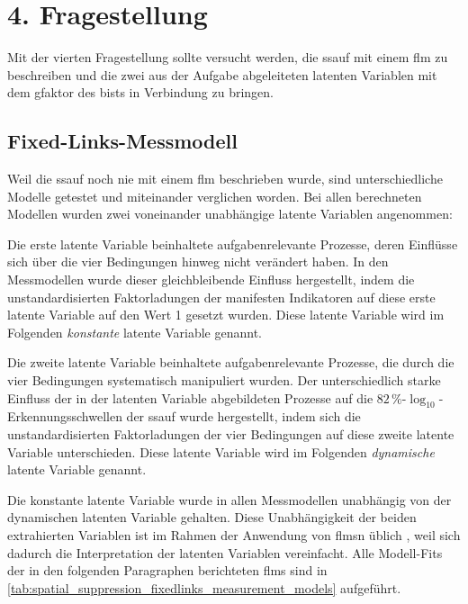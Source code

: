 \documentclass[11pt, twoside, a4paper]{book}		%
\begin{document}
\section{4. Fragestellung \label{sec:4Fragestellung}}

Mit der vierten Fragestellung sollte versucht werden, die \gls{ssauf} mit einem \gls{flm} zu beschreiben und die zwei aus der Aufgabe abgeleiteten latenten Variablen mit dem \gls{gfaktor} des \gls{bist}s in Verbindung zu bringen.

\subsection{Fixed-Links-Messmodell \label{subsec:spatial_suppression_fixed_links_messmodell}}

Weil die \gls{ssauf} noch nie mit einem \gls{flm} beschrieben wurde, sind unterschiedliche Modelle getestet und miteinander verglichen worden. Bei allen berechneten Modellen wurden zwei voneinander unabhängige latente Variablen angenommen: 

Die erste latente Variable beinhaltete aufgabenrelevante Prozesse, deren Einflüsse sich über die vier Bedingungen hinweg nicht verändert haben. In den Messmodellen wurde dieser gleichbleibende Einfluss hergestellt, indem die unstandardisierten Faktorladungen der manifesten Indikatoren auf diese erste latente Variable auf den Wert 1 gesetzt wurden. Diese latente Variable wird im Folgenden \textit{konstante} latente Variable genannt. 

Die zweite latente Variable beinhaltete aufgabenrelevante Prozesse, die durch die vier Bedingungen systematisch manipuliert wurden. Der unterschiedlich starke Einfluss der in der latenten Variable abgebildeten Prozesse auf die $82\,\%$-$\log_{10}$-Er\-ken\-nungs\-schwel\-len der \gls{ssauf} wurde hergestellt, indem sich die unstandardisierten Faktorladungen der vier Bedingungen auf diese zweite latente Variable unterschieden.
Diese latente Variable wird im Folgenden \textit{dynamische} latente Variable genannt.

Die konstante latente Variable wurde in allen Messmodellen unabhängig von der dynamischen latenten Variable gehalten. Diese Unabhängigkeit der beiden extrahierten Variablen ist im Rahmen der Anwendung von \glspl{flm}n üblich \citep[z.~B.][]{Ren2013, Schweizer2007, Schweizer2009a, Stankov2007, Wang2015}, weil sich dadurch die Interpretation der latenten Variablen vereinfacht.
Alle Modell-Fits der in den folgenden Paragraphen berichteten \glspl{flm} sind in \autoref{tab:spatial_suppression_fixedlinks_measurement_models} aufgeführt.
\end{document}
